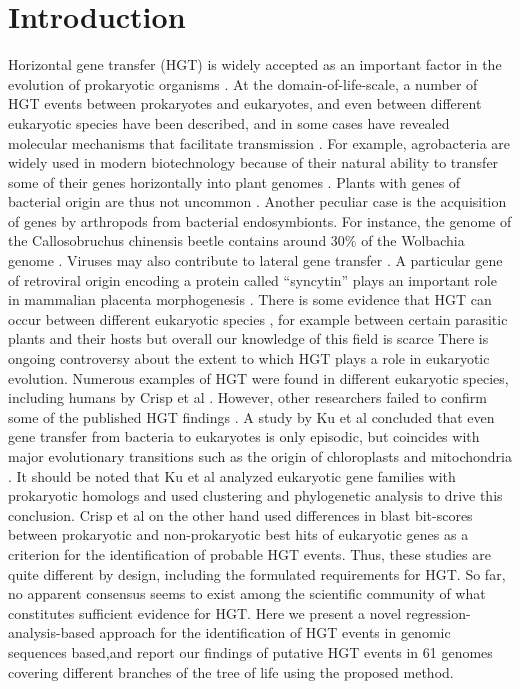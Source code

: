 \section{Introduction}
Horizontal gene transfer (HGT) is widely accepted as an important factor in the
evolution of prokaryotic organisms \cite{Ochman2000}. At the
domain-of-life-scale, a number of HGT events between prokaryotes and
eukaryotes, and even between different eukaryotic species have been described,
and in some cases have revealed molecular mechanisms that facilitate
transmission \cite{Soucy2015}. For example, agrobacteria are widely used in
modern biotechnology because of their natural ability to transfer some of their
genes horizontally into plant genomes \cite{Chilton1977}. Plants with genes of
bacterial origin are thus not uncommon \cite{Kyndt2015, Matveeva2012,
Matveeva2014}. Another peculiar case is the acquisition of genes by arthropods
from bacterial endosymbionts. For instance, the genome of the Callosobruchus
chinensis beetle contains around 30\% of the Wolbachia genome \cite{Nikoh2008}.
Viruses may also contribute to lateral gene transfer \cite{Drezen2017}. A
particular gene of retroviral origin encoding a protein called “syncytin” plays
an important role in mammalian placenta morphogenesis \cite{Mi2000}. There is
some evidence that HGT can occur between different eukaryotic species
\cite{Soucy2015}, for example between certain parasitic plants and their hosts
\cite{Yoshida2010,Xi2012,Zhang2013,Zhang2014} but overall our knowledge of
this field is scarce There is ongoing controversy about the extent to which HGT
plays a role in eukaryotic evolution. Numerous examples of HGT were found in
different eukaryotic species, including humans by Crisp et al \cite{Crisp2015}.
However, other researchers failed to confirm some of the published HGT findings
\cite{Salzberg2017}. A study by Ku et al concluded that even gene transfer from
bacteria to eukaryotes is only episodic, but coincides with major evolutionary
transitions such as the origin of chloroplasts and mitochondria \cite{Ku2015}.
It should be noted that Ku et al analyzed eukaryotic gene families with
prokaryotic homologs and used clustering and phylogenetic analysis to drive
this conclusion. Crisp et al on the other hand used differences in blast
bit-scores between prokaryotic and non-prokaryotic best hits of eukaryotic
genes as a criterion for the identification of probable HGT events. Thus, these
studies are quite different by design, including the formulated requirements
for HGT. So far, no apparent consensus seems to exist among the scientific
community of what constitutes sufficient evidence for HGT. Here we present a
novel regression-analysis-based approach for the identification of HGT events
in genomic sequences based,and report our findings of putative HGT events in 61
genomes covering different branches of the tree of life using the proposed
method.
